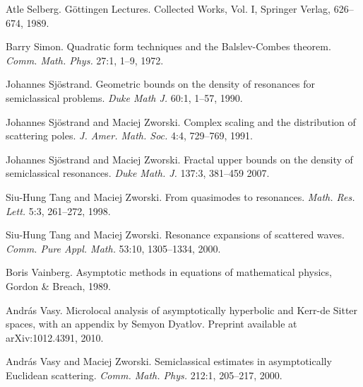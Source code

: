 \documentclass[reqno, 12pt]{amsart}
\theoremstyle{definition}
\numberwithin{equation}{section}
\numberwithin{prop}{section}
\numberwithin{figure}{section}
\begin{document}
\begin{thebibliography}{00}
 Atle Selberg. G\"ottingen Lectures. Collected Works, Vol. I, Springer Verlag, 626--674, 1989.

 Barry Simon. Quadratic form techniques and the Balslev-Combes theorem. \textit{Comm. Math. Phys.} 27:1, 1--9, 1972.

 Johannes Sj\"ostrand. Geometric bounds on the density of resonances for semiclassical problems. \textit{Duke Math J.} 60:1, 1--57, 1990.

 Johannes Sj\"ostrand and Maciej Zworski. Complex scaling and the distribution of scattering poles. \textit{J. Amer. Math. Soc.} 4:4, 729--769, 1991.

 Johannes Sj\"ostrand and Maciej Zworski. Fractal upper bounds on the density of semiclassical resonances. \textit{Duke Math. J.} 137:3, 381--459 2007.


 Siu-Hung Tang and Maciej Zworski. From quasimodes to resonances. \textit{Math. Res. Lett.} 5:3, 261--272, 1998.

  Siu-Hung Tang and Maciej Zworski. Resonance expansions of scattered waves. \textit{Comm. Pure Appl. Math.} 53:10, 1305--1334, 2000.

 Boris  Vainberg. Asymptotic methods in equations of mathematical physics, Gordon \& Breach, 1989.

 Andr\'as Vasy. Microlocal analysis of asymptotically hyperbolic and Kerr-de Sitter spaces, with an appendix by Semyon Dyatlov. Preprint available at arXiv:1012.4391, 2010.


 Andr\'as Vasy and Maciej Zworski. Semiclassical estimates in asymptotically Euclidean scattering. \textit{Comm. Math. Phys.} 212:1, 205--217, 2000.




\end{thebibliography}
\end{document}
